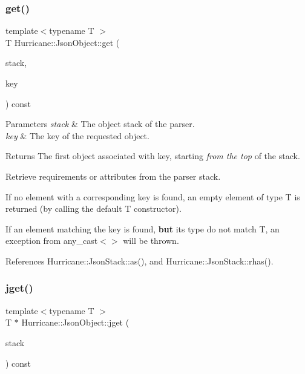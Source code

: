 \subsubsection{\texorpdfstring{get()}{get()}}
{\footnotesize\ttfamily template$<$typename T $>$ \\
T Hurricane\+::\+Json\+Object\+::get (\begin{DoxyParamCaption}\item[{\mbox{\hyperlink{classHurricane_1_1JsonStack}{Json\+Stack}} \&}]{stack,  }\item[{const std\+::string \&}]{key }\end{DoxyParamCaption}) const\hspace{0.3cm}{\ttfamily [inline]}}


\begin{DoxyParams}{Parameters}
{\em stack} & The object stack of the parser. \\
\hline
{\em key} & The key of the requested object. \\
\hline
\end{DoxyParams}
\begin{DoxyReturn}{Returns}
The first object associated with {\ttfamily key}, starting {\itshape from the top} of the stack.
\end{DoxyReturn}
Retrieve requirements or attributes from the parser stack.
\begin{DoxyItemize}
\item If no element with a corresponding key is found, an empty element of type {\ttfamily T} is returned (by calling the default {\ttfamily T} constructor).
\item If an element matching the key is found, {\bfseries but} it\textquotesingle{}s type do not match {\ttfamily T}, an exception from {\ttfamily any\+\_\+cast$<$$>$} will be thrown. 
\end{DoxyItemize}

References Hurricane\+::\+Json\+Stack\+::as(), and Hurricane\+::\+Json\+Stack\+::rhas().

\mbox{\label{classHurricane_1_1JsonObject_a7a3fe903ceb00a3ebff66d1696edf682}} 
\subsubsection{\texorpdfstring{jget()}{jget()}}
{\footnotesize\ttfamily template$<$typename T $>$ \\
T $\ast$ Hurricane\+::\+Json\+Object\+::jget (\begin{DoxyParamCaption}\item[{\mbox{\hyperlink{classHurricane_1_1JsonStack}{Json\+Stack}} \&}]{stack }\end{DoxyParamCaption}) const\hspace{0.3cm}{\ttfamily [inline]}}


